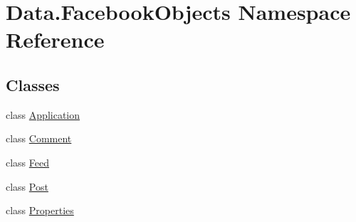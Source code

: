 \hypertarget{namespace_data_1_1_facebook_objects}{}\section{Data.\+Facebook\+Objects Namespace Reference}
\label{namespace_data_1_1_facebook_objects}
\subsection*{Classes}
\begin{DoxyCompactItemize}
\item 
class \hyperlink{class_data_1_1_facebook_objects_1_1_application}{Application}
\item 
class \hyperlink{class_data_1_1_facebook_objects_1_1_comment}{Comment}
\item 
class \hyperlink{class_data_1_1_facebook_objects_1_1_feed}{Feed}
\item 
class \hyperlink{class_data_1_1_facebook_objects_1_1_post}{Post}
\item 
class \hyperlink{class_data_1_1_facebook_objects_1_1_properties}{Properties}
\end{DoxyCompactItemize}
